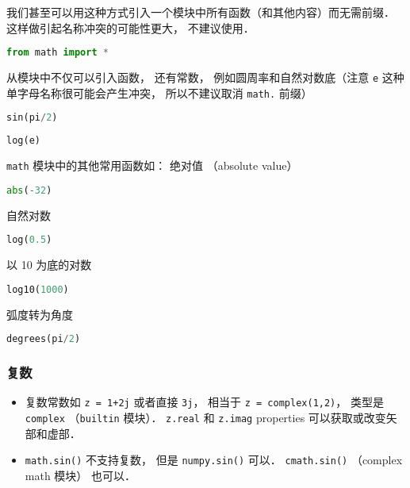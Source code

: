 我们甚至可以用这种方式引入一个模块中所有函数（和其他内容）而无需前缀． 这样做引起名称冲突的可能性更大， 不建议使用．
\begin{lstlisting}[language=python]
from math import *
\end{lstlisting}
从模块中不仅可以引入函数， 还有常数， 例如圆周率和自然对数底（注意 \verb|e| 这种单字母名称很可能会产生冲突， 所以不建议取消 \verb|math.| 前缀）
\begin{lstlisting}[language=python]
sin(pi/2)
\end{lstlisting}
\begin{lstlisting}[language=python]
log(e)
\end{lstlisting}

\verb|math| 模块中的其他常用函数如： 绝对值 （absolute value）
\begin{lstlisting}[language=python]
abs(-32)
\end{lstlisting}
自然对数
\begin{lstlisting}[language=python]
log(0.5)
\end{lstlisting}
以 10 为底的对数
\begin{lstlisting}[language=python]
log10(1000)
\end{lstlisting}
弧度转为角度
\begin{lstlisting}[language=python]
degrees(pi/2)
\end{lstlisting}

\subsubsection{复数}
\begin{itemize}
\item 复数常数如 \verb|z = 1+2j| 或者直接 \verb|3j|， 相当于 \verb|z = complex(1,2)|， 类型是 \verb|complex| （\verb|builtin| 模块）． \verb|z.real| 和 \verb|z.imag| properties 可以获取或改变矢部和虚部．
\item \verb|math.sin()| 不支持复数， 但是 \verb|numpy.sin()| 可以． \verb|cmath.sin()| （complex math 模块） 也可以．
\end{itemize}

